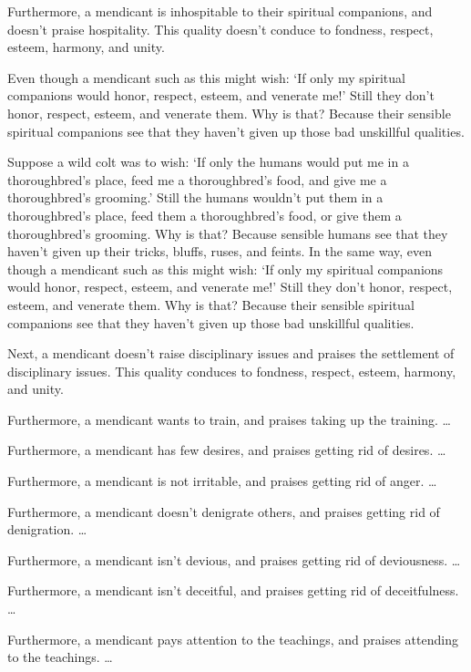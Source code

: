 \documentclass[12pt,openany]{book}%
\begin{document}
Furthermore, a mendicant is inhospitable to their spiritual companions, and doesn’t praise hospitality. This quality doesn’t conduce to fondness, respect, esteem, harmony, and unity. 

Even though a mendicant such as this might wish: ‘If only my spiritual companions would honor, respect, esteem, and venerate me!’ Still they don’t honor, respect, esteem, and venerate them. Why is that? Because their sensible spiritual companions see that they haven’t given up those bad unskillful qualities. 

Suppose a wild colt was to wish: ‘If only the humans would put me in a thoroughbred’s place, feed me a thoroughbred’s food, and give me a thoroughbred’s grooming.’ Still the humans wouldn’t put them in a thoroughbred’s place, feed them a thoroughbred’s food, or give them a thoroughbred’s grooming. Why is that? Because sensible humans see that they haven’t given up their tricks, bluffs, ruses, and feints. In the same way, even though a mendicant such as this might wish: ‘If only my spiritual companions would honor, respect, esteem, and venerate me!’ Still they don’t honor, respect, esteem, and venerate them. Why is that? Because their sensible spiritual companions see that they haven’t given up those bad unskillful qualities. 

Next, a mendicant doesn’t raise disciplinary issues and praises the settlement of disciplinary issues. This quality conduces to fondness, respect, esteem, harmony, and unity. 

Furthermore, a mendicant wants to train, and praises taking up the training. … 

Furthermore, a mendicant has few desires, and praises getting rid of desires. … 

Furthermore, a mendicant is not irritable, and praises getting rid of anger. … 

Furthermore, a mendicant doesn’t denigrate others, and praises getting rid of denigration. … 

Furthermore, a mendicant isn’t devious, and praises getting rid of deviousness. … 

Furthermore, a mendicant isn’t deceitful, and praises getting rid of deceitfulness. … 

Furthermore, a mendicant pays attention to the teachings, and praises attending to the teachings. … 
\end{document}
